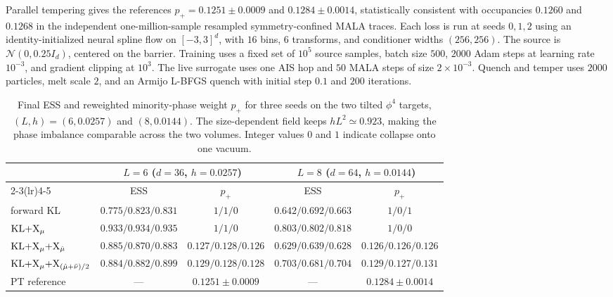 \documentclass{article}
\begin{document}
Parallel tempering gives the references $p_+=0.1251\pm0.0009$ and $0.1284\pm0.0014$, statistically consistent with occupancies $0.1260$ and $0.1268$ in the independent one-million-sample resampled symmetry-confined MALA traces. Each loss is run at seeds $0,1,2$ using an identity-initialized neural spline flow on $[-3,3]^d$, with $16$ bins, $6$ transforms, and conditioner widths $(256,256)$. The source is $\mathcal N(0,0.25I_d)$, centered on the barrier. Training uses a fixed set of $10^5$ source samples, batch size $500$, $2000$ Adam steps at learning rate $10^{-3}$, and gradient clipping at $10^3$. The live surrogate uses one AIS hop and $50$ MALA steps of size $2\times10^{-3}$. Quench and temper uses $2000$ particles, melt scale $2$, and an Armijo L-BFGS quench with initial step $0.1$ and $200$ iterations.

\begin{table}[htb]
    \centering
    \begin{tabular}{@{}l cc cc@{}}
        \toprule
        & \multicolumn{2}{c}{$L=6$ ($d=36$, $h=0.0257$)} & \multicolumn{2}{c}{$L=8$ ($d=64$, $h=0.0144$)} \\
        \cmidrule(lr){2-3}\cmidrule(lr){4-5}
        & ESS & $p_+$ & ESS & $p_+$ \\
        \midrule
        forward KL
        & $0.775/0.823/0.831$ & $1/1/0$
        & $0.642/0.692/0.663$ & $1/0/1$ \\
        $\mathrm{KL}{+}\mathrm{X}_\mu$
        & $0.933/0.934/0.935$ & $1/1/0$
        & $0.803/0.802/0.818$ & $1/0/0$ \\
        $\mathrm{KL}{+}\mathrm{X}_\mu{+}\mathrm{X}_{\hat\mu}$
        & $0.885/0.870/0.883$ & $0.127/0.128/0.126$
        & $0.629/0.639/0.628$ & $0.126/0.126/0.126$ \\
        $\mathrm{KL}{+}\mathrm{X}_\mu{+}\mathrm{X}_{(\hat\mu+\bar\nu)/2}$
        & $0.884/0.882/0.899$ & $0.129/0.128/0.128$
        & $0.703/0.681/0.704$ & $0.129/0.127/0.131$ \\
        \midrule
        PT reference & --- & $0.1251\pm0.0009$ & --- & $0.1284\pm0.0014$ \\
        \bottomrule
    \end{tabular}
    \caption{Final ESS and reweighted minority-phase weight $p_+$ for three seeds on the two tilted $\phi^4$ targets, $(L,h)=(6,0.0257)$ and $(8,0.0144)$. The size-dependent field keeps $hL^2\simeq0.923$, making the phase imbalance comparable across the two volumes. Integer values $0$ and $1$ indicate collapse onto one vacuum.}
    \label{tab: phi4}
\end{table}
\end{document}
